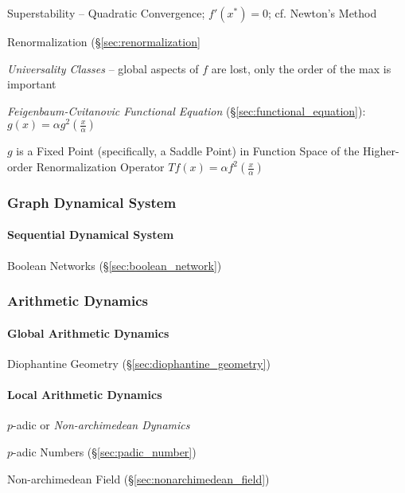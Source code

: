 Superstability -- Quadratic Convergence; $f'(x^*) = 0$; cf. Newton's Method

Renormalization (\S\ref{sec:renormalization}

\emph{Universality Classes} -- global aspects of $f$ are lost, only the order of
the max is important

\emph{Feigenbaum-Cvitanovic Functional Equation}
(\S\ref{sec:functional_equation}): $g(x) = \alpha g^2(\frac{x}{\alpha})$

$g$ is a Fixed Point (specifically, a Saddle Point) in Function Space of the
Higher-order Renormalization Operator $T f(x) = \alpha f^2(\frac{x}{\alpha})$



\subsubsection{Graph Dynamical System}\label{sec:graph_dynamical_system}

\paragraph{Sequential Dynamical System}
\label{sec:sequential_dynamical_system}\hfill

\fist Boolean Networks (\S\ref{sec:boolean_network})



\subsubsection{Arithmetic Dynamics}\label{sec:arithmetic_dynamics}

\paragraph{Global Arithmetic Dynamics}\label{sec:global_arithmetic_dynamics}
\hfill

Diophantine Geometry (\S\ref{sec:diophantine_geometry})



\paragraph{Local Arithmetic Dynamics}\label{sec:global_arithmetic_dynamics}
\hfill

$p$-adic or \emph{Non-archimedean Dynamics}

$p$-adic Numbers (\S\ref{sec:padic_number})

Non-archimedean Field (\S\ref{sec:nonarchimedean_field})



